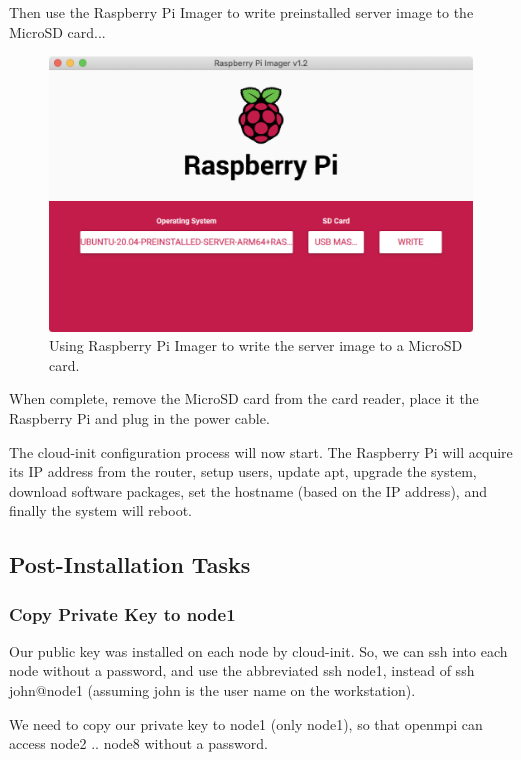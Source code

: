 \documentclass{article}
\begin{document}
Then use the Raspberry Pi Imager to write preinstalled server image to the MicroSD card...

\begin{figure}
	\centering	
	\includegraphics[width=1.0\textwidth]{screenshots/imager-write.png}
	\caption{Using Raspberry Pi Imager to write the server image to a MicroSD card.}
\end{figure}

When complete, remove the MicroSD card from the card reader, place it the Raspberry Pi and plug in the power cable.

The cloud-init configuration process will now start. The Raspberry Pi will acquire its IP address from the router, setup users, update apt, upgrade the system, download software packages, set the hostname (based on the IP address), and finally the system will reboot.


\subsection{Post-Installation Tasks}

\subsubsection{Copy Private Key to node1}

Our public key was installed on each node by cloud-init. So, we can ssh into each node without a password, and use the abbreviated ssh node1, instead of ssh john@node1 (assuming john is the user name on the workstation).

We need to copy our private key to node1 (only node1), so that openmpi can access node2 .. node8 without a password.
\end{document}
